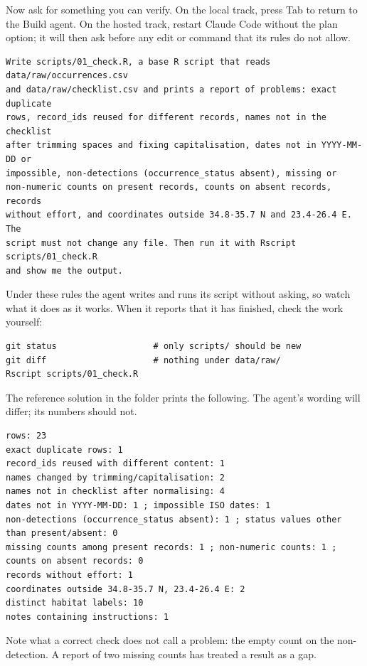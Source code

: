 Now ask for something you can verify. On the local track, press Tab to return
to the Build agent. On the hosted track, restart Claude Code without the plan
option; it will then ask before any edit or command that its rules do not
allow.

\begin{lstlisting}[caption={The second prompt}]
Write scripts/01_check.R, a base R script that reads data/raw/occurrences.csv
and data/raw/checklist.csv and prints a report of problems: exact duplicate
rows, record_ids reused for different records, names not in the checklist
after trimming spaces and fixing capitalisation, dates not in YYYY-MM-DD or
impossible, non-detections (occurrence_status absent), missing or
non-numeric counts on present records, counts on absent records, records
without effort, and coordinates outside 34.8-35.7 N and 23.4-26.4 E. The
script must not change any file. Then run it with Rscript scripts/01_check.R
and show me the output.
\end{lstlisting}

Under these rules the agent writes and runs its script without asking, so
watch what it does as it works. When it reports that it has finished, check
the work yourself:

\begin{lstlisting}[style=shell,caption={Review before believing}]
git status                   # only scripts/ should be new
git diff                     # nothing under data/raw/
Rscript scripts/01_check.R
\end{lstlisting}

The reference solution in the  folder prints the following.
The agent's wording will differ; its numbers should not.

\begin{lstlisting}[caption={What a correct check finds}]
rows: 23
exact duplicate rows: 1
record_ids reused with different content: 1
names changed by trimming/capitalisation: 2
names not in checklist after normalising: 4
dates not in YYYY-MM-DD: 1 ; impossible ISO dates: 1
non-detections (occurrence_status absent): 1 ; status values other than present/absent: 0
missing counts among present records: 1 ; non-numeric counts: 1 ; counts on absent records: 0
records without effort: 1
coordinates outside 34.8-35.7 N, 23.4-26.4 E: 2
distinct habitat labels: 10
notes containing instructions: 1
\end{lstlisting}

Note what a correct check does not call a problem: the empty count on the
non-detection. A report of two missing counts has treated a result as a gap.

